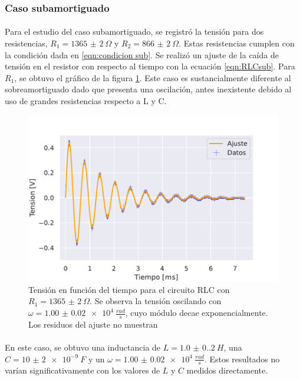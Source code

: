 

\subsubsection{Caso subamortiguado}\label{sec:RLC sub}
\paragraph{}
Para el estudio del caso subamortiguado, se registró la tensión para dos resistencias, $R_1=\SI{1365(2)}{\Omega}$ y $R_2=\SI{866(2)}{\Omega}$. Estas resistencias cumplen con la condición dada en \eqref{eqn:condicion sub}. Se realizó un ajuste de la caída de tensión en el resistor con respecto al tiempo con la ecuación \eqref{eqn:RLCsub}. Para $R_1$, se obtuvo el gráfico de la figura \ref{fig:RLC subamortiguado 1}. Este caso es sustancialmente diferente al sobreamortiguado dado que presenta una oscilación, antes inexistente debido al uso de grandes resistencias respecto a L y C.

\begin{figure} [H]
    \centering
    \includegraphics[scale=0.7]{Figuras/RLC/RLC subamortiguado 1.pdf}
    \caption{Tensión en función del tiempo para el circuito RLC con $R_1 = \SI{1365(2)}{\Omega}$. Se observa la tensión oscilando con $\omega = \SI{1.00(2)e4}{\frac{rad}{s}}$, cuyo módulo decae exponencialmente. Los residuos del ajuste no muestran }
    \label{fig:RLC subamortiguado 1}
\end{figure}
\paragraph{}
En este caso, se obtuvo una inductancia de $L = \SI{1.0(0.2)}{H}$, una $C = \SI{10(2)e-9}{F}$ y un $\omega = \SI{1.00(2)e4}{\frac{rad}{s}}$. Estos resultados no varían significativamente con los valores de $L$ y $C$ medidos directamente. 
